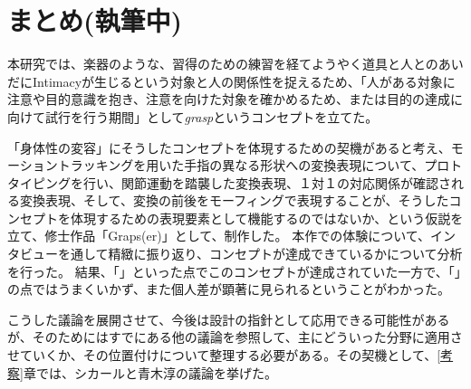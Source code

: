 \chapter{まとめ(執筆中)}
本研究では、楽器のような、習得のための練習を経てようやく道具と人とのあいだにIntimacyが生じるという対象と人の関係性を捉えるため、「人がある対象に注意や目的意識を抱き、注意を向けた対象を確かめるため、または目的の達成に向けて試行を行う期間」として\textit{grasp}というコンセプトを立てた。

「身体性の変容」にそうしたコンセプトを体現するための契機があると考え、モーショントラッキングを用いた手指の異なる形状への変換表現について、プロトタイピングを行い、関節運動を踏襲した変換表現、１対１の対応関係が確認される変換表現、そして、変換の前後をモーフィングで表現することが、そうしたコンセプトを体現するための表現要素として機能するのではないか、という仮説を立て、修士作品「Graps(er)」として、制作した。
本作での体験について、インタビューを通して精緻に振り返り、コンセプトが達成できているかについて分析を行った。
結果、「」といった点でこのコンセプトが達成されていた一方で、「」の点ではうまくいかず、また個人差が顕著に見られるということがわかった。

こうした議論を展開させて、今後は設計の指針として応用できる可能性があるが、そのためにはすでにある他の議論を参照して、主にどういった分野に適用させていくか、その位置付けについて整理する必要がある。その契機として、\ref{考察}章では、シカールと青木淳の議論を挙げた。
